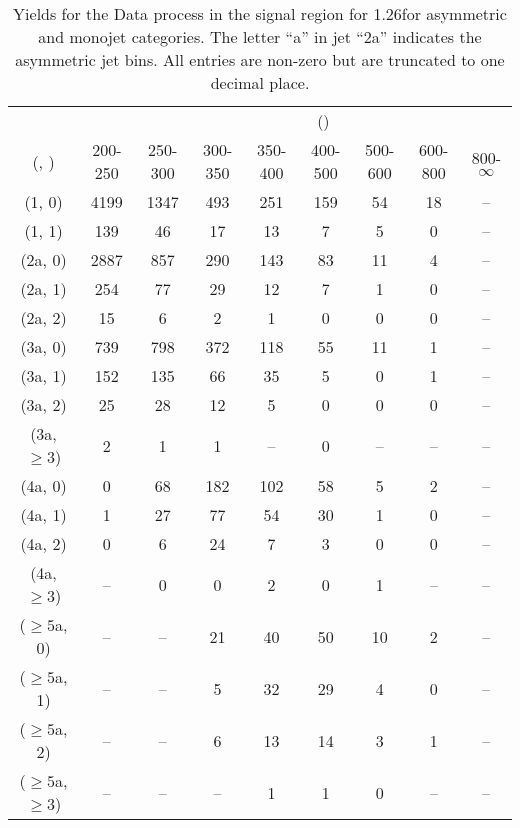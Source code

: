 \begin{table}[h!]
\tiny
\centering
\caption{Yields for the Data process in the signal region for 1.26\ifb for asymmetric and monojet categories. The letter ``a'' in jet \eg ``2a''  indicates the asymmetric jet bins. All entries are non-zero but are truncated to one decimal place.\label{tab:yieldssep_data_sig_asym}}
\begin{tabular}
{ccccccccc}
	\hline\hline
&	& \multicolumn{8}{c}{\scalht (\gev)} \\ 
	 (\njet,  \nb) & 200-250 & 250-300 & 300-350 & 350-400 & 400-500 & 500-600 & 600-800 & 800-$\infty$ \\ [0.8ex] 
\hline
	(1, 0) & 4199 & 1347 & 493 & 251 & 159 & 54 & 18 & -- \\[0.5ex] 
	(1, 1) & 139 & 46 & 17 & 13 & 7 & 5 & 0 & -- \\[0.5ex] 
	(2a, 0) & 2887 & 857 & 290 & 143 & 83 & 11 & 4 & -- \\[0.5ex] 
	(2a, 1) & 254 & 77 & 29 & 12 & 7 & 1 & 0 & -- \\[0.5ex] 
	(2a, 2) & 15 & 6 & 2 & 1 & 0 & 0 & 0 & -- \\[0.5ex] 
	(3a, 0) & 739 & 798 & 372 & 118 & 55 & 11 & 1 & -- \\[0.5ex] 
	(3a, 1) & 152 & 135 & 66 & 35 & 5 & 0 & 1 & -- \\[0.5ex] 
	(3a, 2) & 25 & 28 & 12 & 5 & 0 & 0 & 0 & -- \\[0.5ex] 
	(3a, $\ge3$) & 2 & 1 & 1 & -- & 0 & -- & -- & -- \\[0.5ex] 
	(4a, 0) & 0 & 68 & 182 & 102 & 58 & 5 & 2 & -- \\[0.5ex] 
	(4a, 1) & 1 & 27 & 77 & 54 & 30 & 1 & 0 & -- \\[0.5ex] 
	(4a, 2) & 0 & 6 & 24 & 7 & 3 & 0 & 0 & -- \\[0.5ex] 
	(4a, $\ge3$) & -- & 0 & 0 & 2 & 0 & 1 & -- & -- \\[0.5ex] 
	($\ge5$a, 0) & -- & -- & 21 & 40 & 50 & 10 & 2 & -- \\[0.5ex] 
	($\ge5$a, 1) & -- & -- & 5 & 32 & 29 & 4 & 0 & -- \\[0.5ex] 
	($\ge5$a, 2) & -- & -- & 6 & 13 & 14 & 3 & 1 & -- \\[0.5ex] 
	($\ge5$a, $\ge3$) & -- & -- & -- & 1 & 1 & 0 & -- & -- \\[0.5ex] 
	\hline
	\hline
\end{tabular}
\end{table}
